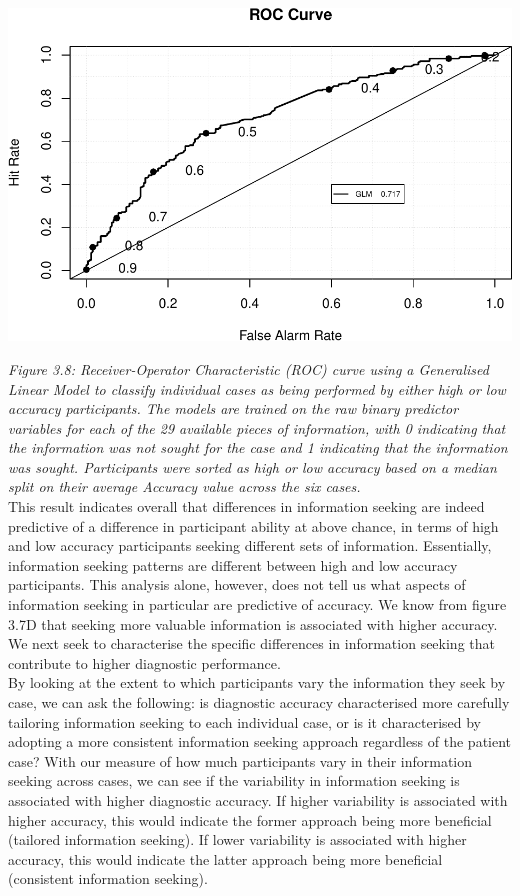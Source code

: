 \documentclass[a4paper, nobind]{templates/ociamthesis}
\begin{document}
\begin{center}\includegraphics[width=1\linewidth]{_main_files/figure-latex/accuracyClassifier-1} \end{center}

\emph{Figure 3.8: Receiver-Operator Characteristic (ROC) curve using a Generalised Linear Model to classify individual cases as being performed by either high or low accuracy participants. The models are trained on the raw binary predictor variables for each of the 29 available pieces of information, with 0 indicating that the information was not sought for the case and 1 indicating that the information was sought. Participants were sorted as high or low accuracy based on a median split on their average Accuracy value across the six cases.}\\

This result indicates overall that differences in information seeking are indeed predictive of a difference in participant ability at above chance, in terms of high and low accuracy participants seeking different sets of information. Essentially, information seeking patterns are different between high and low accuracy participants. This analysis alone, however, does not tell us what aspects of information seeking in particular are predictive of accuracy. We know from figure 3.7D that seeking more valuable information is associated with higher accuracy. We next seek to characterise the specific differences in information seeking that contribute to higher diagnostic performance.\\

By looking at the extent to which participants vary the information they seek by case, we can ask the following: is diagnostic accuracy characterised more carefully tailoring information seeking to each individual case, or is it characterised by adopting a more consistent information seeking approach regardless of the patient case? With our measure of how much participants vary in their information seeking across cases, we can see if the variability in information seeking is associated with higher diagnostic accuracy. If higher variability is associated with higher accuracy, this would indicate the former approach being more beneficial (tailored information seeking). If lower variability is associated with higher accuracy, this would indicate the latter approach being more beneficial (consistent information seeking).
\end{document}

